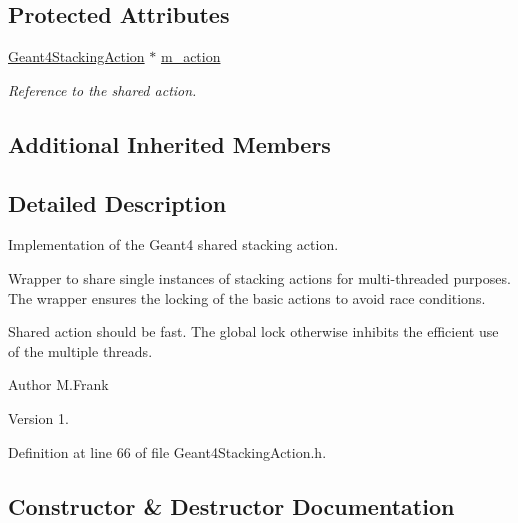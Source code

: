 \subsection*{Protected Attributes}
\begin{DoxyCompactItemize}
\item 
\hyperlink{class_d_d4hep_1_1_simulation_1_1_geant4_stacking_action}{Geant4\+Stacking\+Action} $\ast$ \hyperlink{class_d_d4hep_1_1_simulation_1_1_geant4_shared_stacking_action_a3f3be5f46d2ee56467337edf438fc153}{m\+\_\+action}
\begin{DoxyCompactList}\small\item\em Reference to the shared action. \end{DoxyCompactList}\end{DoxyCompactItemize}
\subsection*{Additional Inherited Members}


\subsection{Detailed Description}
Implementation of the Geant4 shared stacking action. 

Wrapper to share single instances of stacking actions for multi-\/threaded purposes. The wrapper ensures the locking of the basic actions to avoid race conditions.

Shared action should be \textquotesingle{}fast\textquotesingle{}. The global lock otherwise inhibits the efficient use of the multiple threads.

\begin{DoxyAuthor}{Author}
M.\+Frank 
\end{DoxyAuthor}
\begin{DoxyVersion}{Version}
1. 
\end{DoxyVersion}


Definition at line 66 of file Geant4\+Stacking\+Action.\+h.



\subsection{Constructor \& Destructor Documentation}
\hypertarget{class_d_d4hep_1_1_simulation_1_1_geant4_shared_stacking_action_ad110c178df46ccebfe884e469ef3e21e}{}\label{class_d_d4hep_1_1_simulation_1_1_geant4_shared_stacking_action_ad110c178df46ccebfe884e469ef3e21e} 
